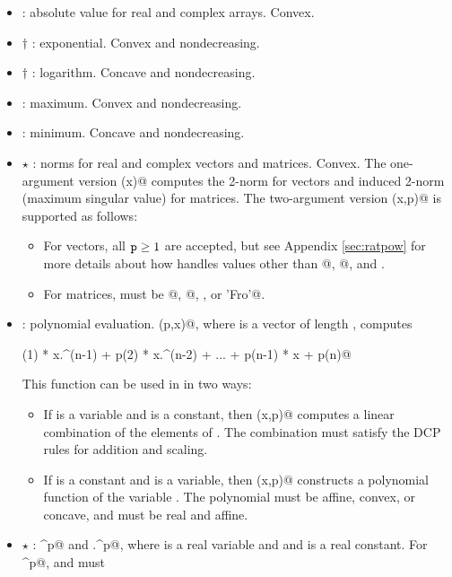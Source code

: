\documentclass[12pt]{article}
\begin{document}
\begin{itemize}
\item \verb@abs@: absolute value for real 
and complex arrays.
Convex.
\item $\dagger$ \verb@exp@: exponential. Convex and nondecreasing.
\item $\dagger$ \verb@log@: logarithm. Concave and nondecreasing.
\item \verb@max@: maximum. Convex and nondecreasing.
\item \verb@min@: minimum. Concave and nondecreasing.
\item $\star$ \verb@norm@: norms for real and complex vectors and matrices. Convex. The 
one-argument version \verb@norm(x)@ computes the 2-norm for vectors and 
induced 2-norm (maximum singular value) for matrices. 
The two-argument version \verb@norm(x,p)@ is supported as follows:
\begin{itemize}
\item For vectors, all $\verb@p@\geq 1$ are accepted, but see
Appendix \ref{sec:ratpow} for more details about how \cvx
handles values other than @, @, and \verb@Inf@.
\item For matrices, \verb@p@ must be @, @, \verb@Inf@, or
\verb@'Fro'@.
\end{itemize}
\item \verb@polyval@: polynomial evaluation. \verb@polyval(p,x)@, 
where \verb@p@ is a vector of length \verb@n@, computes
\begin{center}
	\verb@p(1) * x.^(n-1) + p(2) * x.^(n-2) + ... + p(n-1) * x + p(n)@
\end{center}
This function can be used in \cvx in two ways:
\begin{itemize}
\item If \verb@p@ is a variable and \verb@x@ is a constant, then \verb@polyval(x,p)@
	  computes a linear combination of the elements of \verb@p@. The combination
	  must satisfy the DCP rules for addition and scaling.
\item If \verb@p@ is a constant and \verb@x@ is a variable, then \verb@polyval(x,p)@
      constructs a polynomial function of the variable \verb@x@. The 
      polynomial must be affine, convex, or concave, and 
       \verb@x@ must be real and affine.
\end{itemize}
\item $\star$ \verb@power@: \verb@x^p@ and \verb@x.^p@, where \verb@x@ is a real variable and
and \verb@p@ is a real constant. For \verb@x^p@, \verb@x@ and \verb@p@ must

\end{itemize}
\end{document}
